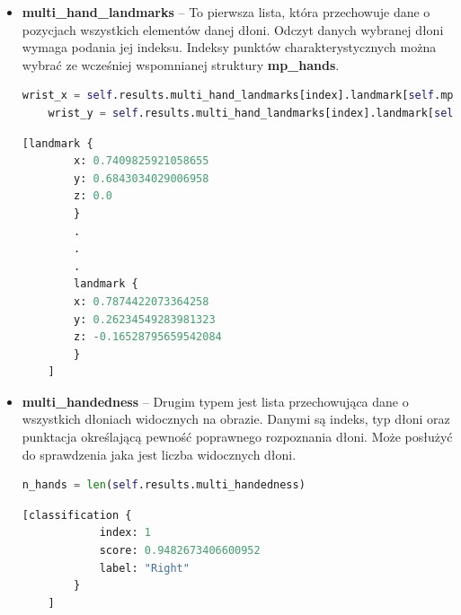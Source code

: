\begin{itemize}
    \item \textbf{multi\_hand\_landmarks} -- To pierwsza lista, która przechowuje dane o pozycjach wszystkich elementów danej dłoni. Odczyt danych wybranej dłoni wymaga podania jej indeksu. Indeksy punktów charakterystycznych można wybrać ze wcześniej wspomnianej struktury \textbf{mp\_hands}. \newpage
    
    \begin{lstlisting}[caption={Przykład korzystania z \textbf{multi\_hand\_landmarks}},captionpos=b,language=python, style=command]
    wrist_x = self.results.multi_hand_landmarks[index].landmark[self.mp_hands.HandLandmark.WRIST].x
    wrist_y = self.results.multi_hand_landmarks[index].landmark[self.mp_hands.HandLandmark.WRIST].y
    \end{lstlisting}

    \begin{lstlisting}[caption={Przykład elementu listy \textbf{multi\_hand\_landmarks}},captionpos=b,language=python, style=command]
    [landmark {
        x: 0.7409825921058655
        y: 0.6843034029006958
        z: 0.0
        }
        .
        .
        .
        landmark {
        x: 0.7874422073364258
        y: 0.26234549283981323
        z: -0.16528795659542084
        }
    ]
    \end{lstlisting}
    
      
    \item \textbf{multi\_handedness} -- Drugim typem jest lista przechowująca dane o wszystkich dłoniach widocznych na obrazie. Danymi są indeks, typ dłoni oraz punktacja określającą pewność poprawnego rozpoznania dłoni. Może posłużyć do sprawdzenia jaka jest liczba widocznych dłoni. \newline
    
    \begin{lstlisting}[caption={Przykład korzystania z \textbf{multi\_handedness}},captionpos=b,language=python, style=command]
    n_hands = len(self.results.multi_handedness)
    \end{lstlisting}

    \begin{lstlisting}[caption={Przykład elementu listy \textbf{multi\_handedness}},captionpos=b,language=python,style=command]
    [classification {
            index: 1
            score: 0.9482673406600952
            label: "Right"
        }
    ]
    \end{lstlisting}
\end{itemize}

